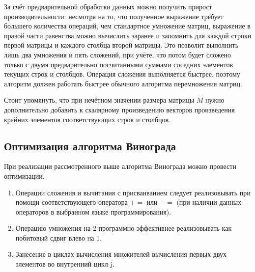 За счёт предварительной обработки данных можно получить прирост производительности: несмотря на то, что  полученное выражение требует большего количества операций, чем стандартное умножение матриц, выражение в правой части равенства можно вычислить заранее и запомнить для каждой строки первой матрицы и каждого столбца второй матрицы. 
Это позволит выполнить лишь два умножения и пять сложений, при учёте, что потом будет сложено только с двумя предварительно посчитанными суммами соседних элементов текущих строк и столбцов. 
Операция сложения выполняется быстрее, поэтому алгоритм должен работать быстрее обычного алгоритма перемножения матриц.

Стоит упомянуть, что при нечётном значении размера матрицы $M$ нужно дополнительно добавить к скалярному произведению векторов произведения крайних элементов соответствующих строк и столбцов.

\subsection{Оптимизация алгоритма Винограда}

При реализации рассмотренного выше алгоритма Винограда можно провести оптимизации.
\begin{enumerate}
	\item Операции сложения и вычитания с присваиванием следует реализовывать при помощи соответствующего оператора $+=$ или $-=$ (при наличии данных операторов в выбранном языке программирования).
	\item Операцию умножения на 2 программно эффективнее реализовывать как побитовый сдвиг влево на 1.
	\item Занесение в циклах вычисления множителей вычисления первых двух
	элементов во внутренний цикл j.
\end{enumerate}